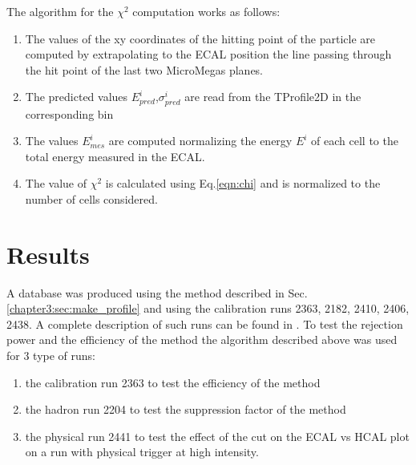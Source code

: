 The algorithm for the $\chi^2$ computation works as follows:
\begin{enumerate}
\item The values of the xy coordinates of the hitting point of the
  particle are computed by extrapolating to the ECAL position the line
  passing through the hit point of the last two MicroMegas planes.
\item The predicted values $E_{pred}^i$,$\sigma^{i}_{pred}$ are read from the TProfile2D in
  the corresponding bin
\item The values $E_{mes}^i$ are computed normalizing the energy $E^i$
  of each cell to the total energy measured in the ECAL.
\item The value of $\chi^2$ is calculated using Eq.\ref{eqn:chi} and is
  normalized to the number of cells considered.
\end{enumerate}

\section{Results}
\label{chapter3:sec:chi2-result}

A database was produced using the method described in
Sec.\ref{chapter3:sec:make_profile} and using the calibration runs 2363, 2182,
2410, 2406, 2438. A complete description of such runs can be found in
\cite{na64-runs}. To test the rejection power and the efficiency of the
method the algorithm described above was used for 3 type of runs:
\begin{enumerate}
\item the calibration run 2363 to test the efficiency of the method
\item the hadron run 2204 to test the suppression factor of the method
\item the physical run 2441 to test the effect of the cut on the ECAL
  vs HCAL plot on a run with physical trigger at high intensity.
\end{enumerate}

